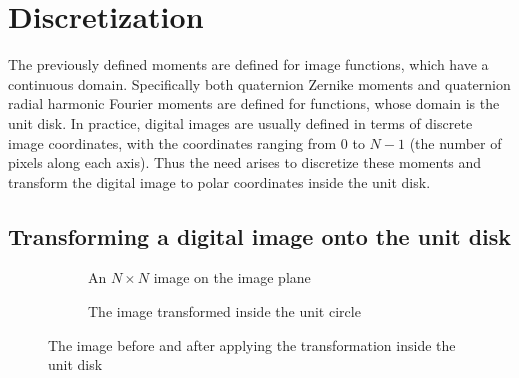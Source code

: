 \section{Discretization}\label{sec:discretization}
The previously defined moments are defined for image functions, which have a continuous domain. Specifically both quaternion Zernike moments and quaternion radial harmonic Fourier moments are defined for functions, whose domain is the unit disk. In practice, digital images are usually defined in terms of discrete image coordinates, with the coordinates ranging from $0$ to $N-1$ (the number of pixels along each axis). Thus the need arises to discretize these moments and transform the digital image to polar coordinates inside the unit disk.


\subsection{Transforming a digital image onto the unit disk}
\begin{figure}[tb]
    \begin{subfigure}{.43\textwidth}
    \centering
    \caption{An $N \times N$ image on the image plane}
    \end{subfigure}
    \begin{subfigure}{.05\textwidth}
      \centering
    \end{subfigure}
    \begin{subfigure}{.50\textwidth}
      \centering
      \caption{The image transformed inside the unit circle}
      \end{subfigure}
    \caption{The image before and after applying the transformation inside the unit disk}
    \label{fig:transform1}
\end{figure}

